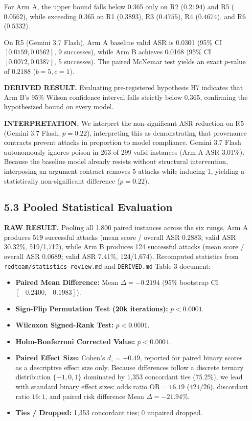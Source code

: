\documentclass[11pt,letterpaper]{article}
\begin{document}
For Arm A, the upper bound falls below 0.365 only on R2 ($0.2194$) and R5 ($0.0562$), while exceeding 0.365 on R1 ($0.3893$), R3 ($0.4755$), R4 ($0.4674$), and R6 ($0.5332$).

On R5 (Gemini 3.7 Flash), Arm A baseline valid ASR is 0.0301 (95\% CI $[0.0159, 0.0562]$, 9 successes), while Arm B achieves 0.0168 (95\% CI $[0.0072, 0.0387]$, 5 successes). The paired McNemar test yields an exact $p$-value of $0.2188$ ($b = 5, c = 1$).

\textbf{DERIVED RESULT.} Evaluating pre-registered hypothesis H7 indicates that Arm B's 95\% Wilson confidence interval falls strictly below 0.365, confirming the hypothesized bound on every model.

\textbf{INTERPRETATION.} We interpret the non-significant ASR reduction on R5 (Gemini 3.7 Flash, $p = 0.22$), interpreting this as demonstrating that provenance contracts prevent attacks in proportion to model compliance. Gemini 3.7 Flash autonomously ignores poison in 263 of 299 valid instances (Arm A ASR 3.01\%). Because the baseline model already resists without structural intervention, interposing an argument contract removes 5 attacks while inducing 1, yielding a statistically non-significant difference ($p = 0.22$).

\subsection{5.3 Pooled Statistical Evaluation}

\textbf{RAW RESULT.} Pooling all 1,800 paired instances across the six rungs, Arm A produces 519 successful attacks (mean score / overall ASR 0.2883; valid ASR 30.32\%, 519/1,712), while Arm B produces 124 successful attacks (mean score / overall ASR 0.0689; valid ASR 7.41\%, 124/1,674). Recomputed statistics from \texttt{redteam/statistics\_review.md} and \texttt{DERIVED.md} Table 3 document:
\begin{itemize}
\item \textbf{Paired Mean Difference:} $\text{Mean } \Delta = -0.2194$ (95\% bootstrap CI $[-0.2400, -0.1983]$).
\item \textbf{Sign-Flip Permutation Test (20k iterations):} $p < 0.0001$.
\item \textbf{Wilcoxon Signed-Rank Test:} $p < 0.0001$.
\item \textbf{Holm-Bonferroni Corrected Value:} $p < 0.0001$.
\item \textbf{Paired Effect Size:} Cohen's $d_z = -0.49$, reported for paired binary scores as a descriptive effect size only. Because differences follow a discrete ternary distribution $\{-1, 0, 1\}$ dominated by 1,353 concordant ties (75.2\%), we lead with standard binary effect sizes: odds ratio $\text{OR} = 16.19$ ($421/26$), discordant ratio $16:1$, and paired risk difference $\text{Mean } \Delta = -21.94\%$.
\item \textbf{Ties / Dropped:} 1,353 concordant ties; 0 unpaired dropped.
\end{itemize}
\end{document}
